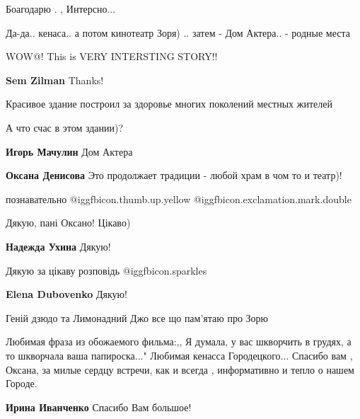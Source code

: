 \begin{itemize}
\begin{itemize}
\end{itemize} %

Боагодарю . , Интерсно...

Да-да.. кенаса.. а потом кинотеатр Зоря) .. затем - Дом Актера.. - родные места

WOW@! This is VERY INTERSTING STORY!!

\begin{itemize} %
\textbf{Sem Zilman} Thanks!
\end{itemize} %

Красивое здание построил за здоровье многих поколений местных жителей

А что счас в этом здании)?

\begin{itemize} %
\textbf{Игорь Мачулин} Дом Актера

\textbf{Оксана Денисова} Это продолжает традиции - любой храм в чом то и театр)!
\end{itemize} %

познавательно  @igg{fbicon.thumb.up.yellow} @igg{fbicon.exclamation.mark.double}

Дякую, пані Оксано! Цікаво)

\begin{itemize} %
\textbf{Надежда Ухина} Дякую!
\end{itemize} %

Дякую за цікаву розповідь @igg{fbicon.sparkles} 

\begin{itemize} %
\textbf{Elena Dubovenko} Дякую!
\end{itemize} %

Геній дзюдо та Лимонадний Джо все що пам'ятаю про Зорю


Любимая фраза из обожаемого фильма:,, Я думала, у вас шкворчить в грудях, а то
шкворчала ваша папироска..." Любимая кенасса Городецкого... Спасибо вам ,
Оксана, за милые сердцу встречи, как и всегда , информативно и тепло о нашем
Городе.

\begin{itemize} %
\textbf{Ирина Иванченко} Спасибо Вам большое!
\end{itemize} %


\end{itemize}
